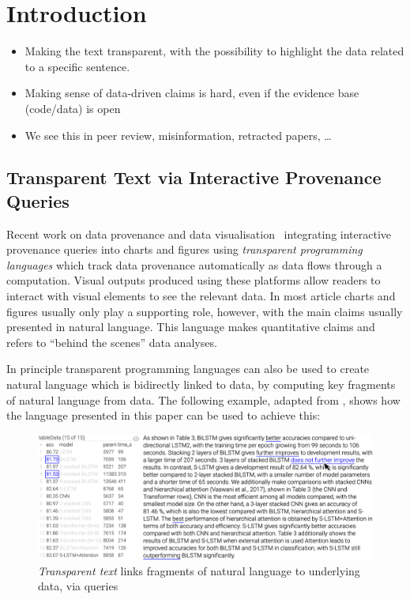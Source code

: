 \section{Introduction}

\begin{itemize}
    \item Making the text transparent, with the possibility to highlight the data related to a specific sentence.
    \item Making sense of data-driven claims is hard, even if the evidence base (code/data) is open
    \item We see this in peer review, misinformation, retracted papers, …
\end{itemize}


\subsection{Transparent Text via Interactive Provenance Queries}

Recent work on data provenance and data visualisation~\citep{psallidas18smoke,perera22,bond25} integrating
interactive provenance queries into charts and figures using \emph{transparent programming languages} which
track data provenance automatically as data flows through a computation. Visual outputs produced using these
platforms allow readers to interact with visual elements to see the relevant data. In most article charts and
figures usually only play a supporting role, however, with the main claims usually presented in natural
language. This language makes quantitative claims and refers to ``behind the scenes'' data analyses.

In principle transparent programming languages can also be used to create natural language which is bidirectly
linked to data, by computing key fragments of natural language from data. The following example, adapted from
\cite{moosavi21}, shows how the language presented in this paper can be used to achieve this:

\begin{figure}[h]
    \centering
    \includegraphics[width=\linewidth]{fig/scigen-1805.02474v1-10-with-pointer.png}
    \caption{\emph{Transparent text} links fragments of natural language to underlying data, via queries}\label{fig:scigen-example-website}
\end{figure}

